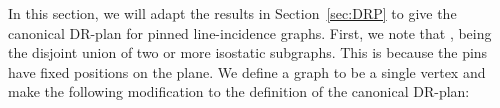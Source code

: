 In this section, we will adapt the results in Section~\ref{sec:DRP} to give the canonical DR-plan for pinned line-incidence graphs. First, we note that
, being the disjoint union of two or more isostatic subgraphs. This is because the pins have fixed positions on the plane.
%
%
%
%
%
%
%
We define a  graph to be a single vertex and make the following modification to the definition of the canonical DR-plan:


